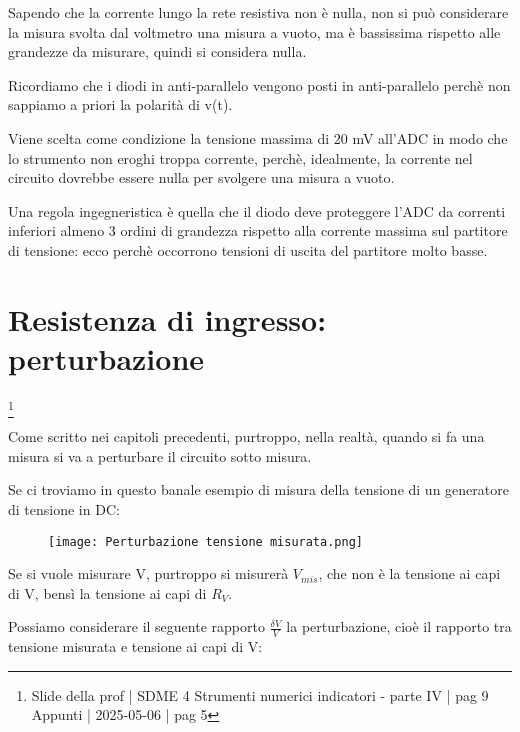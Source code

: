 Sapendo che la corrente lungo la rete resistiva non è nulla, non si può considerare la misura svolta dal voltmetro una misura a vuoto, 
ma è bassissima rispetto alle grandezze da misurare, quindi si considera nulla. \newline 

Ricordiamo che i diodi in anti-parallelo vengono posti in anti-parallelo perchè non sappiamo a priori la polarità di v(t). \newline 

Viene scelta come condizione la tensione massima di 20 mV all'ADC in modo che lo strumento non eroghi troppa corrente, perchè, idealmente, la corrente nel circuito dovrebbe essere nulla per svolgere una misura a vuoto. \newline 

Una regola ingegneristica è quella che il diodo deve proteggere l'ADC da correnti inferiori almeno 3 ordini di grandezza rispetto alla corrente massima sul partitore di tensione: 
ecco perchè occorrono tensioni di uscita del partitore molto basse. \newline 

\newpage 

\section{Resistenza di ingresso: perturbazione}
\footnote{Slide della prof | SDME 4 Strumenti numerici indicatori - parte IV | pag 9\\  
Appunti | 2025-05-06 | pag 5}

Come scritto nei capitoli precedenti, purtroppo, nella realtà, quando si fa una misura si va a perturbare il circuito sotto misura. \newline 

Se ci troviamo in questo banale esempio di misura della tensione di un generatore di tensione in DC: 

\begin{figure}[h]
    \centering
    \texttt{[image: Perturbazione tensione misurata.png]}
\end{figure}

Se si vuole misurare V, purtroppo si misurerà $V_{mis}$, che non è la tensione ai capi di V, bensì la tensione ai capi di $R_V$. \newline 

Possiamo considerare il seguente rapporto $\frac{\delta V}{V}$ la perturbazione, cioè il rapporto tra tensione misurata e tensione ai capi di V:

